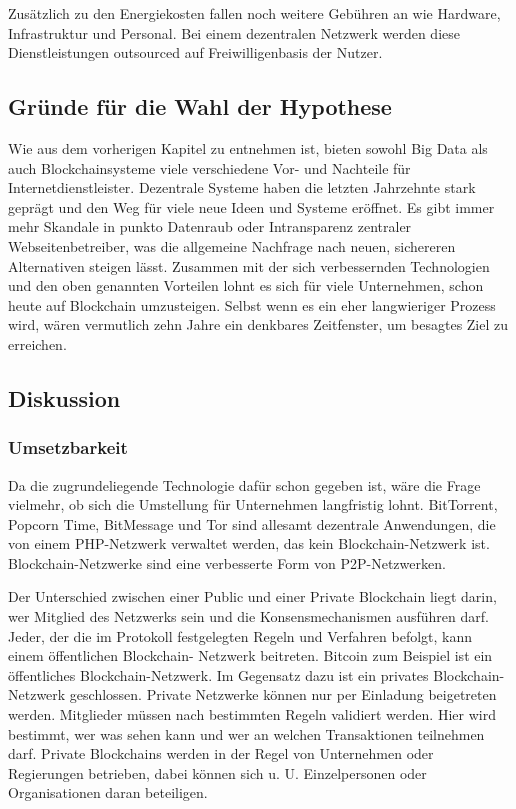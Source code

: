 Zusätzlich zu den Energiekosten fallen noch weitere Gebühren an wie Hardware, Infrastruktur und Personal.
Bei einem dezentralen Netzwerk werden diese Dienstleistungen outsourced auf Freiwilligenbasis der Nutzer.

\subsection{Gründe für die Wahl der Hypothese}
Wie aus dem vorherigen Kapitel zu entnehmen ist, bieten sowohl Big Data als auch Blockchainsysteme viele verschiedene Vor- und Nachteile für Internetdienstleister.
Dezentrale Systeme haben die letzten Jahrzehnte stark geprägt und den Weg für viele neue Ideen und Systeme eröffnet.
Es gibt immer mehr Skandale in punkto Datenraub oder Intransparenz zentraler Webseitenbetreiber, was die allgemeine Nachfrage nach neuen, sichereren Alternativen steigen lässt.
Zusammen mit der sich verbessernden Technologien und den oben genannten Vorteilen lohnt es sich für viele Unternehmen, schon heute auf Blockchain umzusteigen.
Selbst wenn es ein eher langwieriger Prozess wird, wären vermutlich zehn Jahre ein denkbares Zeitfenster, um besagtes Ziel zu erreichen.


\subsection{Diskussion}


\subsubsection{Umsetzbarkeit}
Da die zugrundeliegende Technologie dafür schon gegeben ist, wäre die Frage vielmehr, ob sich die Umstellung für Unternehmen langfristig lohnt.
BitTorrent, Popcorn Time, BitMessage und Tor sind allesamt dezentrale Anwendungen, die von einem PHP-Netzwerk verwaltet werden, das kein Blockchain-Netzwerk ist.
Blockchain-Netzwerke sind eine verbesserte Form von P2P-Netzwerken.

Der Unterschied zwischen einer Public und einer Private Blockchain liegt darin, wer Mitglied des Netzwerks sein und die Konsensmechanismen ausführen darf.
Jeder, der die im Protokoll festgelegten Regeln und Verfahren befolgt, kann einem öffentlichen Blockchain- Netzwerk  beitreten.
Bitcoin  zum  Beispiel  ist  ein öffentliches Blockchain-Netzwerk.
Im Gegensatz dazu ist ein privates Blockchain-Netzwerk geschlossen.
Private Netzwerke können nur per Einladung beigetreten werden.
Mitglieder müssen nach bestimmten Regeln validiert werden. Hier wird bestimmt, wer was sehen kann und wer an welchen Transaktionen teilnehmen darf.
Private Blockchains werden in der Regel von Unternehmen oder Regierungen betrieben, dabei können sich u. U. Einzelpersonen oder Organisationen daran beteiligen.


